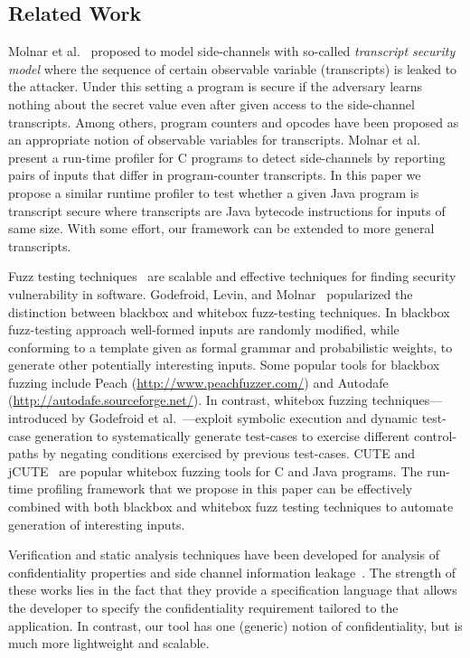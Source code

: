 \subsection{Related Work} 

Molnar et al.~\cite{Molnar05} proposed to model side-channels with
so-called \emph{transcript security model} where the sequence of certain
observable variable (transcripts) is leaked to the attacker.
Under this setting a program is secure if the adversary learns nothing about the
secret value even after given access to the side-channel transcripts.
Among others, program counters and opcodes have been proposed as an appropriate
notion of observable variables for transcripts.
Molnar et al.~\cite{Molnar05} present a run-time profiler for C programs to
detect side-channels by reporting pairs of inputs that differ in program-counter
transcripts.
In this paper we propose a similar runtime profiler to test whether a given
Java program is transcript secure where transcripts are Java bytecode
instructions for inputs of same size.
With some effort, our framework can be extended to more general transcripts.

Fuzz testing techniques~\cite{God12} are scalable and effective techniques for finding security
vulnerability in software.
Godefroid, Levin, and Molnar~\cite{God12} popularized the distinction between
blackbox and whitebox fuzz-testing techniques.
In blackbox fuzz-testing approach well-formed inputs are randomly modified,
while conforming to a template given as formal grammar and probabilistic
weights, to generate other potentially interesting inputs.  
Some popular tools for blackbox fuzzing include Peach 
(\url{http://www.peachfuzzer.com/}) and Autodafe
(\url{http://autodafe.sourceforge.net/}).
In contrast, whitebox fuzzing techniques---introduced by Godefroid et
al.~\cite{God12,GKS05}---exploit symbolic execution and dynamic test-case generation
to systematically generate test-cases to exercise different control-paths by
negating conditions exercised by previous test-cases.
CUTE and jCUTE~\cite{Sen2006} are popular whitebox fuzzing tools for C and Java
programs. 
The run-time profiling framework that we propose in this paper can be
effectively combined with both blackbox and whitebox fuzz testing techniques to
automate generation of interesting inputs.

Verification and static analysis techniques have been developed for
analysis of confidentiality properties and side channel information
leakage~\cite{EWS14,KMO12,BSB07,BDG12,CA09}. The strength of these
works lies in the fact that they provide a specification language that
allows the developer to specify the confidentiality requirement
tailored to the application. In contrast, our tool has one
(generic) notion of confidentiality, but is much more lightweight and
scalable. 

